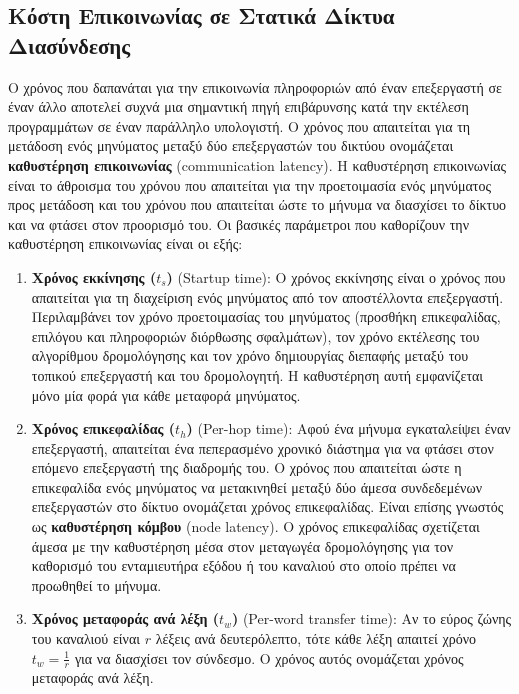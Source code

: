 \documentclass[12pt,a4paper]{article}
\begin{document}
\subsection{Κόστη Επικοινωνίας σε Στατικά Δίκτυα Διασύνδεσης}
Ο χρόνος που δαπανάται για την επικοινωνία πληροφοριών από έναν επεξεργαστή 
σε έναν άλλο αποτελεί συχνά μια σημαντική πηγή επιβάρυνσης κατά την 
εκτέλεση προγραμμάτων σε έναν παράλληλο υπολογιστή. Ο χρόνος που απαιτείται 
για τη μετάδοση ενός μηνύματος μεταξύ δύο επεξεργαστών του δικτύου 
ονομάζεται \textbf{καθυστέρηση επικοινωνίας}
(\foreignlanguage{english}{communication latency}). Η καθυστέρηση 
επικοινωνίας είναι το άθροισμα του χρόνου που απαιτείται για την 
προετοιμασία ενός μηνύματος προς μετάδοση και του χρόνου που απαιτείται 
ώστε το μήνυμα να διασχίσει το δίκτυο και να φτάσει στον προορισμό του. 
Οι βασικές παράμετροι που καθορίζουν την καθυστέρηση επικοινωνίας είναι 
οι εξής:

\begin{enumerate}
\item \textbf{Χρόνος εκκίνησης ($t_s$)} 
(\foreignlanguage{english}{Startup time}):
Ο χρόνος εκκίνησης είναι ο χρόνος που απαιτείται για τη διαχείριση ενός 
μηνύματος από τον αποστέλλοντα επεξεργαστή. Περιλαμβάνει τον χρόνο 
προετοιμασίας του μηνύματος (προσθήκη επικεφαλίδας, επιλόγου και 
πληροφοριών διόρθωσης σφαλμάτων), τον χρόνο εκτέλεσης του αλγορίθμου 
δρομολόγησης και τον χρόνο δημιουργίας διεπαφής μεταξύ του τοπικού 
επεξεργαστή και του δρομολογητή. Η καθυστέρηση αυτή εμφανίζεται μόνο μία 
φορά για κάθε μεταφορά μηνύματος.

\item \textbf{Χρόνος επικεφαλίδας ($t_h$)}
(\foreignlanguage{english}{Per-hop time}):
Αφού ένα μήνυμα εγκαταλείψει έναν επεξεργαστή, απαιτείται ένα πεπερασμένο 
χρονικό διάστημα για να φτάσει στον επόμενο επεξεργαστή της διαδρομής του. 
Ο χρόνος που απαιτείται ώστε η επικεφαλίδα ενός μηνύματος να μετακινηθεί 
μεταξύ δύο άμεσα συνδεδεμένων επεξεργαστών στο δίκτυο ονομάζεται χρόνος 
επικεφαλίδας. Είναι επίσης γνωστός ως \textbf{καθυστέρηση κόμβου} 
(\foreignlanguage{english}{node latency}). Ο χρόνος επικεφαλίδας σχετίζεται 
άμεσα με την καθυστέρηση μέσα στον μεταγωγέα δρομολόγησης για τον 
καθορισμό του ενταμιευτήρα εξόδου ή του καναλιού στο οποίο πρέπει να 
προωθηθεί το μήνυμα.

\item \textbf{Χρόνος μεταφοράς ανά λέξη ($t_w$)}
(\foreignlanguage{english}{Per-word transfer time}):
Αν το εύρος ζώνης του καναλιού είναι $r$ λέξεις ανά δευτερόλεπτο, τότε 
κάθε λέξη απαιτεί χρόνο $t_w = \frac{1}{r}$ για να διασχίσει τον σύνδεσμο. 
Ο χρόνος αυτός ονομάζεται χρόνος μεταφοράς ανά λέξη.
\end{enumerate}
\end{document}
